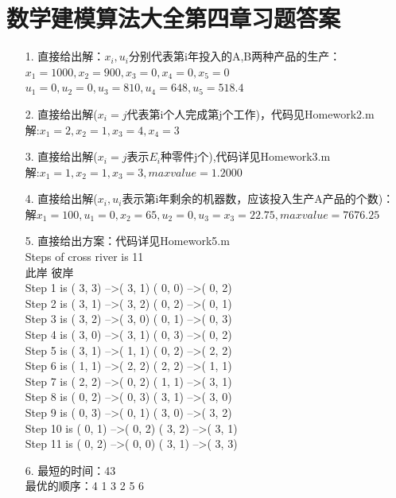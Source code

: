 \documentclass[a4paper,20pt]{article}
\begin{document}
\section{数学建模算法大全第四章习题答案}
\begin{itemize}
    \item[1.] 直接给出解：$x_i,u_i$分别代表第i年投入的A,B两种产品的生产：
        \\$x_1=1000,x_2=900,x_3=0,x_4=0,x_5=0$
            \\$u_1=0,u_2=0,u_3=810,u_4=648,u_5=518.4$
    \item[2.] 直接给出解($x_i=j$代表第i个人完成第j个工作)，代码见Homework2.m
        \\解:$x_1=2,x_2=1,x_3=4,x_4=3$
    \item[3.] 直接给出解($x_i=j$表示$E_i$种零件j个),代码详见Homework3.m
        \\解:$x_1=1,x_2=1,x_3=3,maxvalue=1.2000$
    \item[4.] 直接给出解($x_i,u_i$表示第i年剩余的机器数，应该投入生产A产品的个数)：
        \\解$x_1=100,u_1=0,x_2=65,u_2=0,u_3=x_3=22.75,maxvalue=7676.25$
    \item[5.] 直接给出方案：代码详见Homework5.m
        \\    Steps of cross river is 11
        \\		        此岸 \qquad\qquad \qquad\qquad\qquad\qquad\qquad                         彼岸
        \\Step  1 is ( 3, 3) --\textgreater ( 3, 1) \qquad \qquad  \qquad      ( 0, 0) --\textgreater ( 0, 2)
        \\Step  2 is ( 3, 1) --\textgreater ( 3, 2) \qquad \qquad  \qquad      ( 0, 2) --\textgreater ( 0, 1)
        \\Step  3 is ( 3, 2) --\textgreater ( 3, 0) \qquad \qquad  \qquad      ( 0, 1) --\textgreater ( 0, 3)
        \\Step  4 is ( 3, 0) --\textgreater ( 3, 1) \qquad \qquad  \qquad      ( 0, 3) --\textgreater ( 0, 2)
        \\Step  5 is ( 3, 1) --\textgreater ( 1, 1) \qquad \qquad  \qquad      ( 0, 2) --\textgreater ( 2, 2)
        \\Step  6 is ( 1, 1) --\textgreater ( 2, 2) \qquad \qquad  \qquad      ( 2, 2) --\textgreater ( 1, 1)
        \\Step  7 is ( 2, 2) --\textgreater ( 0, 2) \qquad \qquad  \qquad      ( 1, 1) --\textgreater ( 3, 1)
        \\Step  8 is ( 0, 2) --\textgreater ( 0, 3) \qquad \qquad  \qquad      ( 3, 1) --\textgreater ( 3, 0)
        \\Step  9 is ( 0, 3) --\textgreater ( 0, 1) \qquad \qquad  \qquad      ( 3, 0) --\textgreater ( 3, 2)
        \\Step 10 is ( 0, 1) --\textgreater ( 0, 2) \qquad \qquad  \qquad      ( 3, 2) --\textgreater ( 3, 1)
        \\Step 11 is ( 0, 2) --\textgreater ( 0, 0) \qquad \qquad  \qquad      ( 3, 1) --\textgreater ( 3, 3)
    \item[6.]最短的时间：43
    \\最优的顺序：4 1 3 2 5 6
\end{itemize}
\end{document}
